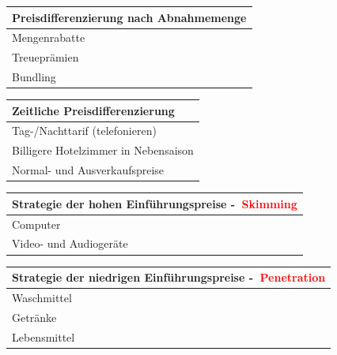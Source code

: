 \documentclass[../ZF_Wing.tex]{subfiles}
\begin{document}
\begin{table} [H]

\begin{tabular}{l}

\colorbox{pink!30}{\textbf{Preisdifferenzierung nach Abnahmemenge} }

\\\hline
Mengenrabatte\\
Treueprämien\\
Bundling\\
\end{tabular}
\end{table}

\begin{table} [H]

\begin{tabular}{l}

\colorbox{pink!30}{\textbf{Zeitliche Preisdifferenzierung} }

\\\hline
Tag-/Nachttarif (telefonieren)\\
 Billigere Hotelzimmer in Nebensaison\\
 Normal- und Ausverkaufspreise\\
\end{tabular}
\end{table}




\begin{table} [H]

\begin{tabular}{l}

\colorbox{pink!30}{\textbf{Strategie der hohen Einführungspreise -$\>$ \textcolor {red}{Skimming}} }

\\\hline
Computer\\
Video- und Audiogeräte\\

\end{tabular}
\end{table}


\begin{table} [H]

\begin{tabular}{l}

\colorbox{pink!30}{\textbf{Strategie der niedrigen Einführungspreise -$\>$ \textcolor {red}{Penetration}}}

\\\hline
Waschmittel\\
Getränke\\
Lebensmittel\\

\end{tabular}
\end{table}
\end{document}
